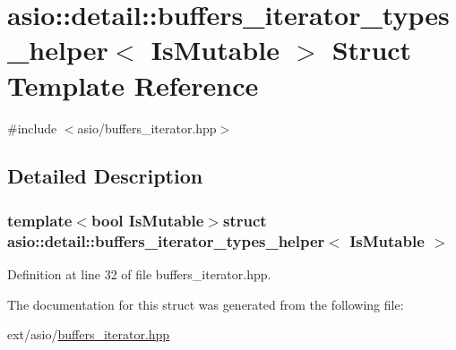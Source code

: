 \hypertarget{structasio_1_1detail_1_1buffers__iterator__types__helper}{}\section{asio\+:\+:detail\+:\+:buffers\+\_\+iterator\+\_\+types\+\_\+helper$<$ Is\+Mutable $>$ Struct Template Reference}
\label{structasio_1_1detail_1_1buffers__iterator__types__helper}


{\ttfamily \#include $<$asio/buffers\+\_\+iterator.\+hpp$>$}



\subsection{Detailed Description}
\subsubsection*{template$<$bool Is\+Mutable$>$struct asio\+::detail\+::buffers\+\_\+iterator\+\_\+types\+\_\+helper$<$ Is\+Mutable $>$}



Definition at line 32 of file buffers\+\_\+iterator.\+hpp.



The documentation for this struct was generated from the following file\+:\begin{DoxyCompactItemize}
\item 
ext/asio/\hyperlink{buffers__iterator_8hpp}{buffers\+\_\+iterator.\+hpp}\end{DoxyCompactItemize}
